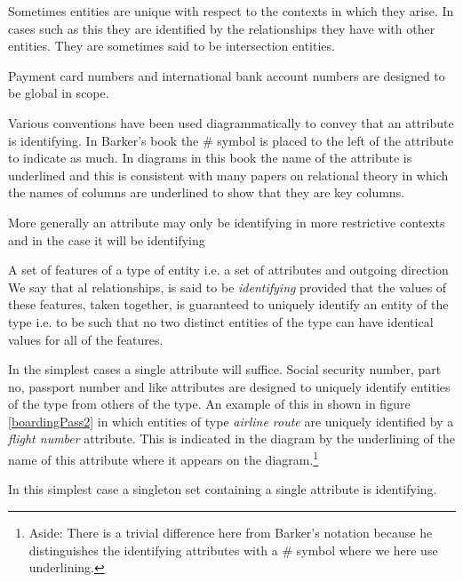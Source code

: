 \mynote Sometimes entities are unique with respect to the contexts in which they arise. In cases such as this they are identified by the relationships they have with other entities. They are sometimes said to be intersection entities.


\mynote Payment card numbers and international bank account numbers are designed to be global in scope.

\mynote
Various conventions have been used diagrammatically to convey that an attribute is identifying. In Barker's book the \# symbol is placed to the left of the attribute to indicate as much. In diagrams in this book the name of the attribute is underlined and this is consistent with many papers on relational theory in which  the names of columns are underlined to show that they are key columns. 

\mynote
More generally an attribute may only be identifying in more restrictive contexts and in the case it will be identifying 


\mynote A set of features of a type of entity i.e. a set of attributes and outgoing direction We say that al relationships, is said to be \textit{identifying} provided that the values of these features,
taken together, is guaranteed to uniquely identify an entity of the type i.e. to be such that no two distinct entities of the type can have identical values for all of the features. 

\mynote In the simplest cases a single attribute will suffice. Social security number, part no, 
passport number and like attributes are designed to uniquely identify entities of the type from others of the type. 
An example of this 
in  shown in figure \ref{boardingPass2} in which entities of type \textit{airline route} are uniquely identified by a \textit{flight number} attribute.
This is
indicated in the diagram  by the underlining of the name of this attribute where it appears on the diagram.\footnote{Aside: There is a trivial difference here from Barker's notation because he distinguishes the identifying attributes with a \# symbol where we here use  underlining.} 

\mynote In this simplest case  a singleton set containing a single attribute is identifying.

